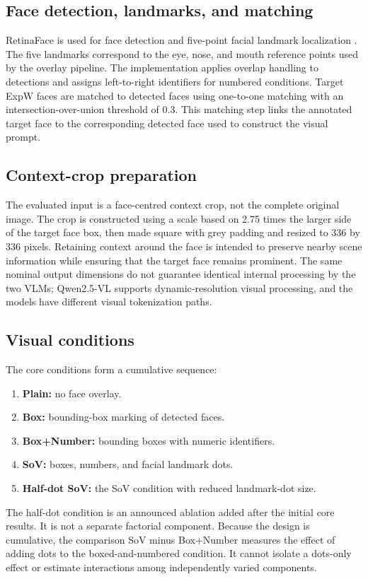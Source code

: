\documentclass[lettersize,journal]{IEEEtran}
\begin{document}
\subsection{Face detection, landmarks, and matching}
RetinaFace is used for face detection and five-point facial landmark localization \cite{deng2020retinaface}. The five landmarks correspond to the eye, nose, and mouth reference points used by the overlay pipeline. The implementation applies overlap handling to detections and assigns left-to-right identifiers for numbered conditions. Target ExpW faces are matched to detected faces using one-to-one matching with an intersection-over-union threshold of 0.3. This matching step links the annotated target face to the corresponding detected face used to construct the visual prompt.

\subsection{Context-crop preparation}
The evaluated input is a face-centred context crop, not the complete original image. The crop is constructed using a scale based on 2.75 times the larger side of the target face box, then made square with grey padding and resized to 336 by 336 pixels. Retaining context around the face is intended to preserve nearby scene information while ensuring that the target face remains prominent. The same nominal output dimensions do not guarantee identical internal processing by the two VLMs; Qwen2.5-VL supports dynamic-resolution visual processing, and the models have different visual tokenization paths.

\subsection{Visual conditions}
The core conditions form a cumulative sequence:
\begin{enumerate}
    \item \textbf{Plain:} no face overlay.
    \item \textbf{Box:} bounding-box marking of detected faces.
    \item \textbf{Box+Number:} bounding boxes with numeric identifiers.
    \item \textbf{SoV:} boxes, numbers, and facial landmark dots.
    \item \textbf{Half-dot SoV:} the SoV condition with reduced landmark-dot size.
\end{enumerate}
The half-dot condition is an announced ablation added after the initial core results. It is not a separate factorial component. Because the design is cumulative, the comparison SoV minus Box+Number measures the effect of adding dots to the boxed-and-numbered condition. It cannot isolate a dots-only effect or estimate interactions among independently varied components.
\end{document}
